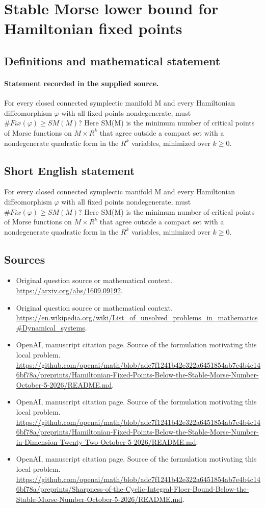\documentclass[11pt]{article}
\begin{document}
\section*{Stable Morse lower bound for Hamiltonian fixed points}\label{30007135}
\subsection{Definitions and mathematical statement}
\paragraph{Statement recorded in the supplied source.}
For every closed connected symplectic manifold M and every Hamiltonian diffeomorphism $\varphi $ with all fixed points nondegenerate, must $\#Fix(\varphi )\geq SM(M)$? Here SM(M) is the minimum number of critical points of Morse functions on $M×R^k$ that agree outside a compact set with a nondegenerate quadratic form in the $R^k$ variables, minimized over $k\geq 0$.
\subsection{Short English statement}
For every closed connected symplectic manifold M and every Hamiltonian diffeomorphism $\varphi $ with all fixed points nondegenerate, must $\#Fix(\varphi )\geq SM(M)$? Here SM(M) is the minimum number of critical points of Morse functions on $M×R^k$ that agree outside a compact set with a nondegenerate quadratic form in the $R^k$ variables, minimized over $k\geq 0$.
\subsection{Sources}
\begin{itemize}
\item[S1] Original question source or mathematical context.
\url{https://arxiv.org/abs/1609.09192}.
\item[S2] Original question source or mathematical context.
\url{https://en.wikipedia.org/wiki/List_of_unsolved_problems_in_mathematics#Dynamical_systems}.
\item[S3] OpenAI, manuscript citation page. Source of the formulation motivating this local problem.
\url{https://github.com/openai/math/blob/adc7f1241b42e322a6451854ab7e4b4c146bf78a/preprints/Hamiltonian-Fixed-Points-Below-the-Stable-Morse-Number-October-5-2026/README.md}.
\item[S4] OpenAI, manuscript citation page. Source of the formulation motivating this local problem.
\url{https://github.com/openai/math/blob/adc7f1241b42e322a6451854ab7e4b4c146bf78a/preprints/Hamiltonian-Fixed-Points-Below-the-Stable-Morse-Number-in-Dimension-Twenty-Two-October-5-2026/README.md}.
\item[S5] OpenAI, manuscript citation page. Source of the formulation motivating this local problem.
\url{https://github.com/openai/math/blob/adc7f1241b42e322a6451854ab7e4b4c146bf78a/preprints/Sharpness-of-the-Cyclic-Integral-Floer-Bound-Below-the-Stable-Morse-Number-October-5-2026/README.md}.
\end{itemize}
\end{document}
